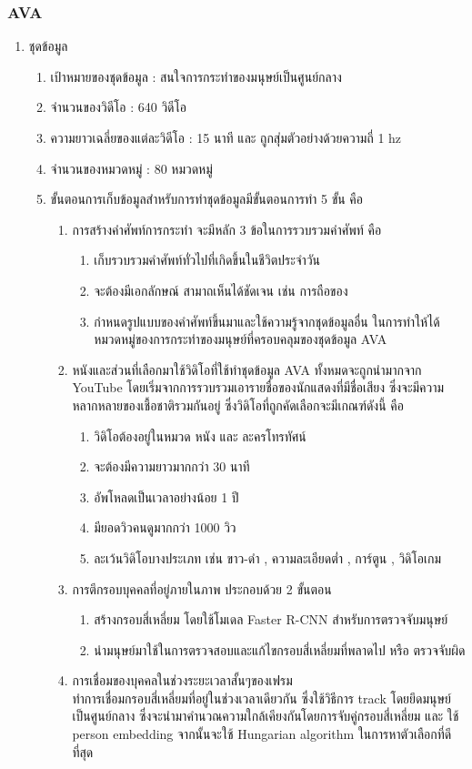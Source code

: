 \subsubsection*{AVA}	
\begin{enumerate}
	\item {ชุดข้อมูล}
	\begin{enumerate}
		\item เป้าหมายของชุดข้อมูล : สนใจการกระทำของมนุษย์เป็นศูนย์กลาง
		\item จำนวนของวิดีโอ : 640 วิดีโอ
		\item ความยาวเฉลี่ยของแต่ละวิดีโอ : 15 นาที และ ถูกสุ่มตัวอย่างด้วยความถี่ 1 hz 
		\item จำนวนของหมวดหมู่ : 80 หมวดหมู่
		\item ขั้นตอนการเก็บข้อมูลสำหรับการทำชุดข้อมูลมีขั้นตอนการทำ 5 ขั้น คือ
	\begin{enumerate}
%
		\item การสร้างคำศัพท์การกระทำ จะมีหลัก 3 ข้อในการรวบรวมคำศัพท์ คือ
		\begin{enumerate}
			\item เก็บรวบรวมคำศัพท์ทั่วไปที่เกิดขึ้นในชีวิตประจำวัน
			\item จะต้องมีเอกลักษณ์ สามาถเห็นได้ชัดเจน เช่น การถือของ
			\item กำหนดรูปแบบของคำศัพท์ขึ้นมาและใช้ความรู้จากชุดข้อมูลอื่น ในการทำให้ได้หมวดหมู่ของการกระทำของมนุษย์ที่ครอบคลุมของชุดข้อมูล AVA
		\end{enumerate}

%
		\item  หนังและส่วนที่เลือกมาใช้วิดิโอที่ใช้ทำชุดข้อมูล AVA ทั้งหมดจะถูกนำมากจาก YouTube โดยเริ่มจากการรวบรวมเอารายชื่อของนักแสดงที่มีชื่อเสียง ซึ่งจะมีความหลากหลายของเชื้อชาติรวมกันอยู่ ซึ่งวิดิโอที่ถูกคัดเลือกจะมีเกณฑ์ดังนี้ คือ
			\begin{enumerate}
				\item วิดิโอต้องอยู่ในหมวด หนัง และ ละครโทรทัศน์
				\item จะต้องมีความยาวมากกว่า 30 นาที
				\item อัพโหลดเป็นเวลาอย่างน้อย 1 ปี
				\item มียอดวิวคนดูมากกว่า 1000 วิว
				\item ละเว้นวิดิโอบางประเภท เช่น ขาว-ดำ , ความละเอียดต่ำ , การ์ตูน , วิดิโอเกม
			\end{enumerate}
%
		\item  การตีกรอบบุคคลที่อยู่ภายในภาพ ประกอบด้วย 2 ขั้นตอน
			\begin{enumerate}
				\item สร้างกรอบสี่เหลี่ยม โดยใช้โมเดล Faster R-CNN สำหรับการตรวจจับมนุษย์
				\item นำมนุษย์มาใช้ในการตรวจสอบและแก้ไขกรอบสี่เหลี่ยมที่พลาดไป หรือ ตรวจจับผิด
			\end{enumerate}	
		\item  การเชื่อมของบุคคลในช่วงระยะเวลาสั้นๆของเฟรม 
\\
ทำการเชื่อมกรอบสี่เหลี่ยมที่อยู่ในช่วงเวลาเดียวกัน ซึ่งใช้วิธีการ track โดยยึดมนุษย์เป็นศูนย์กลาง ซึ่งจะนำมาคำนวณความใกล้เคียงกันโดยการจับคู่กรอบสี่เหลี่ยม และ ใช้ person embedding จากนั้นจะใช้ Hungarian algorithm ในการหาตัวเลือกที่ดีที่สุด


\end{enumerate}
\end{enumerate}
\end{enumerate}
